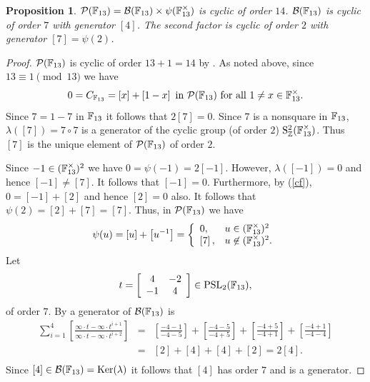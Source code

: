 \documentclass[12pt]{amsart}
\newtheorem{prop}[lem]{Proposition}
\theoremstyle{definition}
\newcommand{\F}[1]{\Bbb{F}_{#1}}
\newcommand{\Z}{\Bbb{Z}}
\newcommand{\pspl}[2]{\mathrm{PSL}_{#1}(#2)}
\newcommand{\pb}[1]{\mathcal{P}(#1)}%
\newcommand{\bl}[1]{\mathcal{B}(#1)}%
\newcommand{\gpb}[1]{\left[ #1\right]} %
\newcommand{\sus}[1]{\psi(#1) }%
\newcommand{\bconst}[1]{C_{#1}}
\newcommand{\<}{\langle}
\renewcommand{\>}{\rangle}
\renewcommand{\ker}[1]{\mathrm{Ker}(#1)}
\newcommand{\asym}[3]{\mathrm{S}^{#1}_{#2}(#3)}
\begin{document}
\begin{prop}\label{prop:f13}  $\pb{\F{13}}=\bl{\F{13}}\times \psi(\F{13}^\times)$ is cyclic of order $14$. $\bl{\F{13}}$ is cyclic of order $7$ with generator $\gpb{4}$. The second factor 
is cyclic of order $2$ with generator $\gpb{7}=\sus{2}$.
\end{prop}
\begin{proof} $\pb{\F{13}}$ is cyclic of order $13+1=14$ by \cite[Corollary 7.6]{hut:cplx13}. As noted above, since $13\equiv 1\pmod{13}$ we have
\begin{eqnarray}\label{cf}
0=\bconst{\F{13}}=\gpb{x}+\gpb{1-x} \mbox{ in } \pb{\F{13}} \mbox{ for all } 1\not=x\in \F{13}^\times.
\end{eqnarray}
Since $7=1-7$ in $\F{13}$ it follows that $2\gpb{7}=0$. Since $7$ is a nonsquare in $\F{13}$, $\lambda(\gpb{7})=7\circ 7$ is a generator of the cyclic group (of order $2$) $\asym{2}{\Z}{\F{13}^\times}$. Thus $\gpb{7}$ is the unique element of $\pb{\F{13}}$ of order $2$. 

Since $-1\in (\F{13}^\times)^2$ we have $0=\sus{-1}=2\gpb{-1}$. However, $\lambda(\gpb{-1})=0$ and hence $\gpb{-1}\not=\gpb{7}$. It follows that $\gpb{-1}=0$.
 Furthermore,  by (\ref{cf}), $0=\gpb{-1}+\gpb{2}$ and hence $\gpb{2}=0$ also. It follows  that $\sus{2}=\gpb{2}+\gpb{7}=\gpb{7}$. Thus, in $\pb{\F{13}}$ we have
\begin{eqnarray}\label{sus}
\sus{u}=\gpb{u}+\gpb{u^{-1}}=
\left\{
\begin{array}{ll}
0,& u\in (\F{13}^\times)^2\\
\gpb{7},&  u\not\in (\F{13}^\times)^2.\\
\end{array}
\right.
\end{eqnarray}
Let 
\[
t=
\left[
\begin{array}{cc}
4&-2\\
-1&4\\
\end{array}
\right]
\in \pspl{2}{\F{13}},
\]
of order $7$. By \cite[p. 64]{hut:cplx13} a generator of $\bl{\F{13}}$ is 
\begin{eqnarray*}
\sum_{i=1}^4\gpb{\frac{\infty\cdot t-\infty\cdot t^{i+1}}{\infty\cdot t-\infty\cdot t^{i+2}}}&=&\gpb{\frac{-4-1}{-4-5}}+\gpb{\frac{-4-5}{-4+5}}+\gpb{\frac{-4+5}{-4+1}}+
\gpb{\frac{-4+1}{-4-4}}\\
&=&\gpb{2}+\gpb{4}+\gpb{4}+\gpb{2}=2\gpb{4}.\\
\end{eqnarray*}
Since $\gpb{4}\in\bl{\F{13}}=\ker{\lambda}$ it follows that $\gpb{4}$ has order $7$ and is a generator. 
\end{proof}
\end{document}
